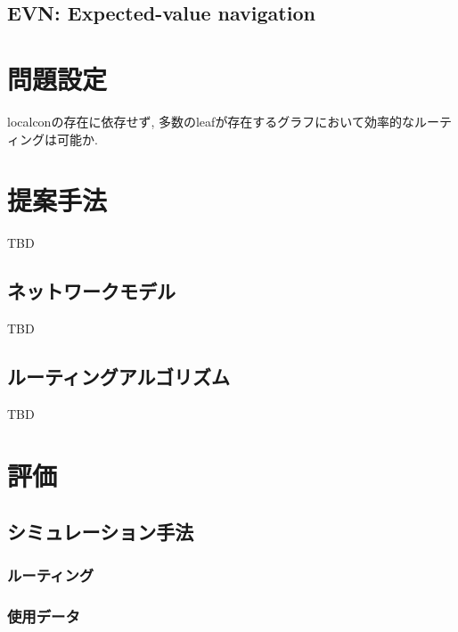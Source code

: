 \documentclass[dvipdfmx]{ampbt}
\begin{document}
   \subsection{EVN: Expected-value navigation}
\cite{clarke2001freenet}
\cite{sandberg2006distributed}
\cite{sandberg2006evolution}
\cite{sandberg2008neighbor}
\cite{mogren2008adaptive}
\cite{evans2007routing}
\cite{clarke2010private}
\cite{schiller2011attack}
\cite{roos2012provable}
\cite{roos2013contribution}
\cite{roos2016dealing}
\cite{hofer2013greedy}
\cite{roos2016anonymous}
\cite{roos2016analyzing}
\cite{kleinberg2000small}
\cite{csimcsek2008navigating}
\cite{serrano2008self}
\cite{boguna2009navigating}
\cite{boguna2009navigability}
\cite{kleinberg2007geographic}
\cite{cvetkovski2009hyperbolic}
\cite{krioukov2010hyperbolic}
\cite{boguna2010sustaining}
\cite{papadopoulos2015network}
\cite{blasius2016efficient}
\cite{kleinberg2006complex}
\cite{huang2014navigation}
\cite{van2010graph}
\fi

\section{問題設定}
\gls{localcon}の存在に依存せず, 多数の\gls{leaf}が存在するグラフにおいて効率的なルーティングは可能か.
\section{提案手法}
TBD
   \subsection{ネットワークモデル}
   TBD
   \subsection{ルーティングアルゴリズム}
   TBD


\section{評価}
  \subsection{シミュレーション手法}
   \subsubsection{ルーティング}
   \subsubsection{使用データ}
\end{document}
